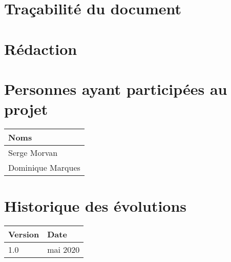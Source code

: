 \newpage

\section*{Tra\c cabilit\'e du document}
\section*{R\'edaction}


\section*{Personnes ayant particip\'ees au projet}

\begin{tabular}{|l|} \hline
Noms \\
\hline
Serge Morvan \\
Dominique Marques \\
\hline
\end{tabular}



\section*{Historique des \'evolutions}

\begin{tabular}{|l|l|} \hline
Version         & Date        \\ 
\hline 
   1.0         &   mai 2020  \\
\hline
\end{tabular}

\newpage
\hbox{}
\newpage


\tableofcontents

\hbox{}
\newpage

\listoffigures

\newpage
\hbox{}
\newpage